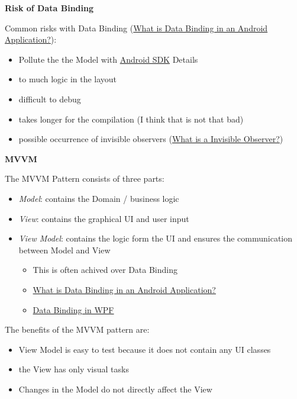 \documentclass[11pt,twoside,landscape]{article}
\begin{document}
\begin{multicols}{3}
\textbf{Risk of Data Binding}

Common risks with Data Binding (\href{../../../roam/20211112100504-what_is_data_binding_in_an_android_application.org}{What is Data Binding in an Android Application?}):
\begin{itemize}
\item Pollute the the Model with \href{../../../roam/20210928175951-android_sdk.org}{Android SDK} Details
\item to much logic in the layout
\item difficult to debug
\item takes longer for the compilation (I think that is not that bad)
\item possible occurrence of invisible observers (\href{../../../roam/20211112110032-what_is_a_invisible_observer.org}{What is a Invisible Observer?})
\end{itemize}


\textbf{MVVM}

The MVVM Pattern consists of three parts:
\begin{itemize}
\item \emph{Model}: contains the Domain / business logic
\item \emph{View}: contains the graphical UI and user input
\item \emph{View Model}: contains the logic form the UI and ensures the communication between Model and View
\begin{itemize}
\item This is often achived over Data Binding
\item \href{../../../roam/20211112100504-what_is_data_binding_in_an_android_application.org}{What is Data Binding in an Android Application?}
\item \href{../../../roam/20211207163530-data_binding_in_wpf.org}{Data Binding in WPF}
\end{itemize}
\end{itemize}


The benefits of the MVVM pattern are:
\begin{itemize}
\item View Model is easy to test because it does not contain any UI classes
\item the View has only visual tasks
\item Changes in the Model do not directly affect the View
\end{itemize}


\end{multicols}
\end{document}
